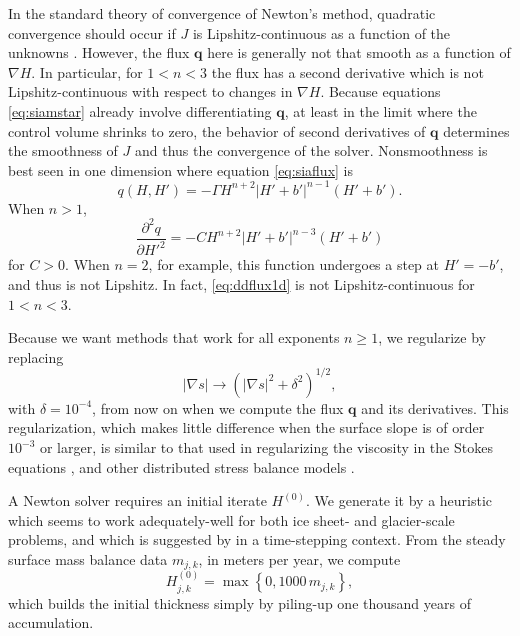 \documentclass[twocolumn,letterpaper]{igs}
\newcommand\bq{\mathbf{q}}
\newcommand{\grad}{\nabla}
\begin{document}
In the standard theory of convergence of Newton's method, quadratic convergence should occur if $J$ is Lipshitz-continuous as a function of the unknowns \citep[and references therein]{Kelley2003}.  However, the flux $\bq$ here is generally not that smooth as a function of $\grad H$.  In particular, for $1<n<3$ the flux has a second derivative which is not Lipshitz-continuous with respect to changes in $\grad H$.  Because equations \eqref{eq:siamstar} already involve differentiating $\bq$, at least in the limit where the control volume shrinks to zero, the behavior of second derivatives of $\bq$ determines the smoothness of $J$ and thus the convergence of the solver.  Nonsmoothness is best seen in one dimension where equation \eqref{eq:siaflux} is
\begin{equation}
q(H,H') = - \Gamma H^{n+2} \left|H'+b'\right|^{n-1} (H'+b'). \label{eq:flux1d}
\end{equation}
When $n>1$,
\begin{equation}
\frac{\partial^2 q}{\partial H'^2} = - C H^{n+2} \left|H'+b'\right|^{n-3} (H'+b') \label{eq:ddflux1d}
\end{equation}
for $C>0$.  When $n=2$, for example, this function undergoes a step at $H'=-b'$, and thus is not Lipshitz.  In fact, \eqref{eq:ddflux1d} is not Lipshitz-continuous for $1<n<3$.

Because we want methods that work for all exponents $n\ge 1$, we regularize by replacing
\begin{equation}
|\grad s| \to \left(|\grad s|^2 + \delta^2\right)^{1/2}, \label{eq:nonlinregularization}
\end{equation}
with $\delta = 10^{-4}$, from now on when we compute the flux $\bq$ and its derivatives.  This regularization, which makes little difference when the surface slope is of order $10^{-3}$ or larger, is similar to that used in regularizing the viscosity in the Stokes equations \citep{GreveBlatter2009}, and other distributed stress balance models \citep[for example]{BrownSmithAhmadia2013,BuelerBrown2009}.

A Newton solver requires an initial iterate $H^{(0)}$.  We generate it by a heuristic which seems to work adequately-well for both ice sheet- and glacier-scale problems, and which is suggested by \cite{JouvetGraeser2013} in a time-stepping context.  From the steady surface mass balance data $m_{j,k}$, in meters per year, we compute
\begin{equation}
H_{j,k}^{(0)} = \max\left\{0,1000\,m_{j,k}\right\},  \label{eq:nonlininitialheuristic}
\end{equation}
which builds the initial thickness simply by piling-up one thousand years of accumulation.
\end{document}
